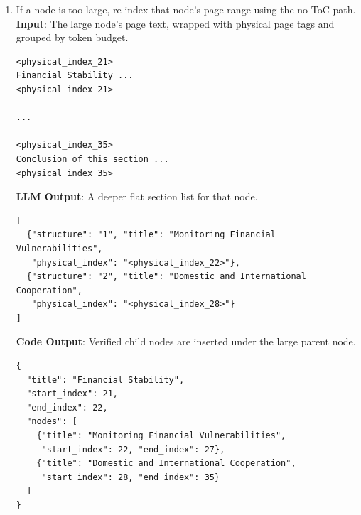\documentclass[11pt,a4paper]{article}
\begin{document}
\begin{enumerate}
\begin{enumerate}[label=(\alph*)]
\begin{lstlisting}[style=pageTextBlockInList]
page_span = 14
token_count = 24000
\end{lstlisting}
        \textbf{LLM Output}: None. This is rules-based. \\
        \textbf{Rule}: Split only when both conditions are true.
\begin{lstlisting}[style=pageTextBlockInList]
page_span > max_page_num_each_node
and
token_count >= max_token_num_each_node
\end{lstlisting}

        \item If a node is too large, re-index that node's page range using the no-ToC path. \\
        \textbf{Input}: The large node's page text, wrapped with physical page tags and grouped by token budget.
\begin{lstlisting}[style=pageTextBlockInList]
<physical_index_21>
Financial Stability ...
<physical_index_21>

...

<physical_index_35>
Conclusion of this section ...
<physical_index_35>
\end{lstlisting}
        \textbf{LLM Output}: A deeper flat section list for that node.
\begin{lstlisting}[style=pageTextBlockInList]
[
  {"structure": "1", "title": "Monitoring Financial Vulnerabilities",
   "physical_index": "<physical_index_22>"},
  {"structure": "2", "title": "Domestic and International Cooperation",
   "physical_index": "<physical_index_28>"}
]
\end{lstlisting}
        \textbf{Code Output}: Verified child nodes are inserted under the large parent node.
\begin{lstlisting}[style=pageTextBlockInList]
{
  "title": "Financial Stability",
  "start_index": 21,
  "end_index": 22,
  "nodes": [
    {"title": "Monitoring Financial Vulnerabilities",
     "start_index": 22, "end_index": 27},
    {"title": "Domestic and International Cooperation",
     "start_index": 28, "end_index": 35}
  ]
}
\end{lstlisting}
    \end{enumerate}


\end{enumerate}
\end{document}
